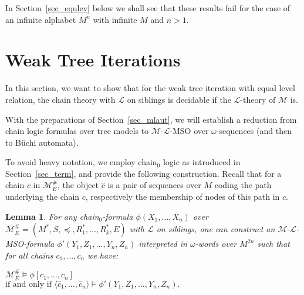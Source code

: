 \documentclass[copyright,creativecommons]{eptcs}
\newtheorem{lemma}[theorem]{Lemma}
\theoremstyle{plain}
\theoremstyle{nonumberplain}
\newcommand{\m}{\ensuremath{\mathcal{M}}}
\newcommand{\el}{\ensuremath{\mathcal{L}}}
\newcommand{\ml}{\ensuremath{\m\textrm{-}\el}}
\newcommand{\MweakE}{\ensuremath{\m^{\#}_E}}
\begin{document}
In Section~\ref{sec_equlev} below we shall see that these results fail for the case of an infinite alphabet $M^n$ with infinite $M$ and $n>1$.



\section{Weak Tree Iterations}\label{sec_weaktree}



In this section, we want to show that for the weak tree iteration with 
equal level relation, the chain theory with $\el$ on siblings is decidable if the 
$\el$-theory of $\m$ is. 

With the preparations of Section~\ref{sec_mlaut}, we will establish 
a reduction from chain logic formulas over tree models to \ml-MSO 
over $\omega$-sequences (and then to B\"uchi automata).

To avoid heavy notation, we employ chain$_0$ logic as introduced in 
Section~\ref{sec_term}, and provide the following construction. Recall that for 
a chain $c$ in $\MweakE$, the object $\hat{c}$ is a pair of sequences over $M$
coding the path underlying the chain $c$, respectively the membership 
of nodes of this path in $c$. 
 
\begin{lemma}
For any chain$_0$-formula  $\phi(X_1,\dots,X_n)$ over $\MweakE = (M^*,S,\preceq,R_1^*,\dots,R_k^*,E)$ 
with $\el$ on siblings, one can construct an $\ml$-MSO-formula $\phi'(Y_1,Z_1,\ldots,Y_n,Z_n)$ interpreted in $\omega$-words over $M^{2n}$ such that for all chains $c_1,\dots,c_n$ we have:
\begin{center}
 $\MweakE \models \phi [c_1,\dots,c_n]$\\
 $\textrm{if and only if }\underline{\langle \hat{c}_1,\ldots,\hat{c}_n\rangle} \models \phi'(Y_1,Z_1,\ldots,Y_n,Z_n).$
\end{center}
\end{lemma}
\end{document}
